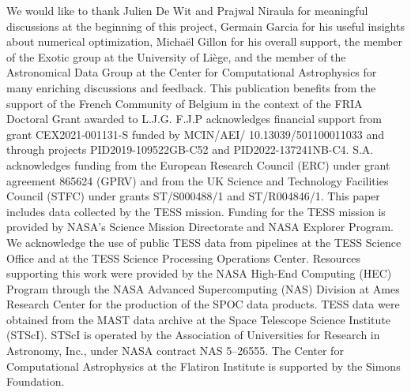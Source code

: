\documentclass[modern]{aastex631}
\begin{document}
\newpage
We would like to thank Julien De Wit and Prajwal Niraula for meaningful discussions at the beginning of this project, Germain Garcia for his useful insights about numerical optimization, Michaël Gillon for his overall support, the member of the Exotic group at the University of Liège, and the member of the Astronomical Data Group at the Center for Computational Astrophysics for many enriching discussions and feedback.  This publication benefits from the support of the French Community of Belgium in the context of the FRIA Doctoral Grant awarded to L.J.G. F.J.P acknowledges financial support from grant CEX2021-001131-S funded by MCIN/AEI/ 10.13039/501100011033 and through projects PID2019-109522GB-C52 and PID2022-137241NB-C4. S.A. acknowledges funding from the European Research Council (ERC) under grant agreement 865624 (GPRV) and from the UK Science and Technology Facilities Council (STFC) under grants ST/S000488/1 and ST/R004846/1. This paper includes data collected by the TESS mission. Funding for the TESS mission is provided by NASA's Science Mission Directorate and NASA Explorer Program. We acknowledge the use of public TESS data from pipelines at the TESS Science Office and at the TESS Science Processing Operations Center. Resources supporting this work were provided by the NASA High-End Computing (HEC) Program through the NASA Advanced Supercomputing (NAS) Division at Ames Research Center for the production of the SPOC data products. TESS data were obtained from the MAST data archive at the Space Telescope Science Institute (STScI). STScI is operated by the Association of Universities for Research in Astronomy, Inc., under NASA contract NAS 5–26555. The Center for Computational Astrophysics at the Flatiron Institute is supported by the Simons Foundation.\\\\

\end{document}
